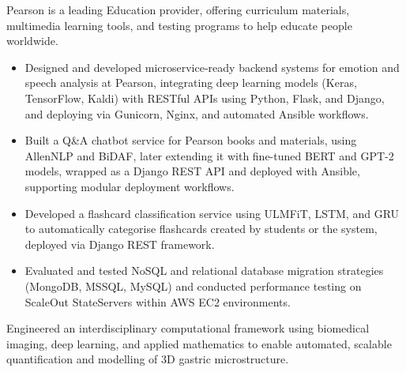 \documentclass[12pt,a4paper,withhyper]{altacv}
\begin{document}
\divider{}

Pearson is a leading Education provider, offering curriculum materials, multimedia learning tools, and testing programs to help educate people worldwide.
\medskip
\begin{itemize}
    \item Designed and developed microservice-ready backend systems for emotion and speech analysis at Pearson, integrating deep learning models (Keras, TensorFlow, Kaldi) with RESTful APIs using Python, Flask, and Django, and deploying via Gunicorn, Nginx, and automated Ansible workflows.

    \item Built a Q\&A chatbot service for Pearson books and materials, using AllenNLP and BiDAF, later extending it with fine-tuned BERT and GPT-2 models, wrapped as a Django REST API and deployed with Ansible, supporting modular deployment workflows.

    \item Developed a flashcard classification service using ULMFiT, LSTM, and GRU to automatically categorise flashcards created by students or the system, deployed via Django REST framework.

    \item Evaluated and tested NoSQL and relational database migration strategies (MongoDB, MSSQL, MySQL) and conducted performance testing on ScaleOut StateServers within AWS EC2 environments.

\end{itemize}

\medskip



Engineered an interdisciplinary computational framework using biomedical imaging, deep learning, and applied mathematics to enable automated, scalable quantification and modelling of 3D gastric microstructure.
\end{document}

